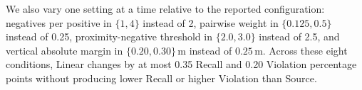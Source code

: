 We also vary one setting at a time relative to the reported configuration: negatives per positive in \(\{1,4\}\) instead of 2, pairwise weight in \(\{0.125,0.5\}\) instead of 0.25, proximity-negative threshold in \(\{2.0,3.0\}\) instead of 2.5, and vertical absolute margin in \(\{0.20,0.30\}\,\mathrm m\) instead of \(0.25\,\mathrm m\). Across these eight conditions, Linear changes by at most 0.35 Recall and 0.20 Violation percentage points without producing lower Recall or higher Violation than Source.
